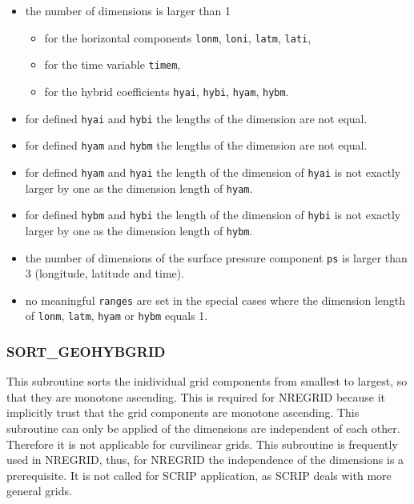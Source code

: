 \documentclass[11pt,twoside]{article}
\begin{document}
\begin{itemize}
\item  the number of dimensions is larger than 1 
       \begin{itemize}
        \item for the horizontal components 
           \verb|lonm|, \verb|loni|, \verb|latm|,  \verb|lati|, 
       \item  for the time variable \verb|timem|,
       \item for the hybrid coefficients \verb|hyai|, \verb|hybi|, \verb|hyam|,
 \verb|hybm|.
\end{itemize}
\item for defined \verb|hyai| and \verb|hybi| the lengths of the dimension are
 not equal.
\item for defined \verb|hyam| and \verb|hybm| the lengths of the dimension are
 not equal.
\item for defined \verb|hyam| and \verb|hyai| the length of the dimension of 
\verb|hyai| is not exactly larger by one as the dimension length of 
\verb|hyam|.
\item for defined \verb|hybm| and \verb|hybi| the length of the dimension of 
\verb|hybi| is not exactly larger by one as the dimension length of 
\verb|hybm|.
\item the number of dimensions of the surface pressure component \verb|ps| is
larger than 3 (longitude, latitude and time).
\item no meaningful \verb|ranges| are set in the special cases where the
dimension length of  \verb|lonm|, \verb|latm|, \verb|hyam|
or  \verb|hybm| equals 1.
\end{itemize}
\subsubsection{SORT\_GEOHYBGRID\label{SORTGRID}}
This subroutine sorts the inidividual grid components from smallest to
largest, so that they are monotone ascending.
This is required for NREGRID because it implicitly trust that the grid
components are monotone ascending.
This subroutine can only be applied of the  dimensions are independent
of each other. Therefore it is  not applicable for curvilinear grids.
This subroutine is frequently used in NREGRID, thus, for NREGRID the 
independence of the dimensions is a prerequisite. It is not called for SCRIP
application, as SCRIP deals with more general grids.
\end{document}
